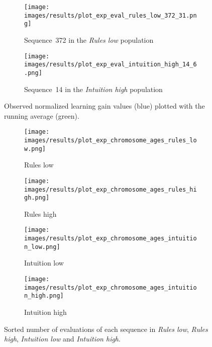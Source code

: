 \begin{figure}[ht]
	\begin{subfigure}{0.9\linewidth}
	\centering
	\texttt{[image: images/results/plot\_exp\_eval\_rules\_low\_372\_31.png]}
	\caption{Sequence~372 in the \emph{Rules low} population}
	\label{fig:exp_eval_rules_low_372}
	\end{subfigure}
	\hfill
	\begin{subfigure}{0.9\linewidth}
	\centering
	\texttt{[image: images/results/plot\_exp\_eval\_intuition\_high\_14\_6.png]}
	\caption{Sequence~14 in the \emph{Intuition high} population}
	\label{fig:exp_eval_innovation_high_14}
	\end{subfigure}
	\caption{Observed normalized learning gain values (blue) plotted with the
	running average (green).}
	\label{fig:exp_eval}
\end{figure}

\begin{figure}[ht]
	\begin{subfigure}{0.49\linewidth}
	\centering
	\texttt{[image: images/results/plot\_exp\_chromosome\_ages\_rules\_low.png]}
	\caption{Rules low}
	\label{fig:exp_age_rules_low}
	\end{subfigure}
	\hfill
	\begin{subfigure}{0.49\linewidth}
	\centering
	\texttt{[image: images/results/plot\_exp\_chromosome\_ages\_rules\_high.png]}
	\caption{Rules high}
	\label{fig:exp_age_rules_high}
	\end{subfigure}
	\begin{subfigure}{0.49\linewidth}
	\centering
	\texttt{[image: images/results/plot\_exp\_chromosome\_ages\_intuition\_low.png]}
	\caption{Intuition low}
	\label{fig:exp_age_intuition_low}
	\end{subfigure}
	\hfill
	\begin{subfigure}{0.49\linewidth}
	\centering
	\texttt{[image: images/results/plot\_exp\_chromosome\_ages\_intuition\_high.png]}
	\caption{Intuition high}
	\label{fig:exp_age_intuition_high}
	\end{subfigure}
	\caption{Sorted number of evaluations of each sequence in \emph{Rules
	low}, \emph{Rules high}, \emph{Intuition low} and \emph{Intuition high}.}
	\label{fig:exp_ages1}
\end{figure}

